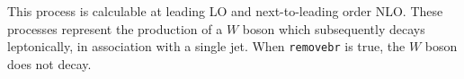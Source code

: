 \label{subsec:w1jet}
This process is calculable at leading LO and next-to-leading order NLO.
These processes represent the production of a $W$ boson which subsequently
decays leptonically, in association with a single jet.
When {\tt removebr} is true, the $W$ boson does not decay.

